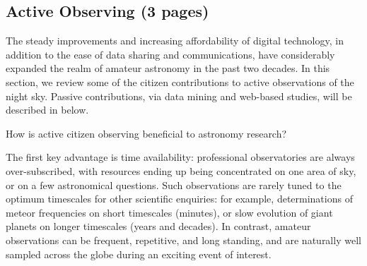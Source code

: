 \documentclass{ar2e}
\begin{document}

\subsection{Active Observing (3 pages)}
\label{sec:obs:active}



The steady improvements and increasing affordability of digital technology, in
addition to the ease of data sharing and communications, have considerably
expanded the realm of amateur astronomy in the past two decades.  
In this section, we review some of the citizen contributions to active
observations of the night sky.  Passive contributions, via data mining and
web-based studies, will be described in  below.

How is active citizen observing beneficial to astronomy research? 

The first key advantage is time availability: professional observatories are
always over-subscribed, with resources ending up being concentrated on one area
of sky, or on a few astronomical questions.  Such observations are rarely tuned
to the optimum timescales for other scientific enquiries: for example,
determinations of meteor frequencies on short timescales (minutes), or slow
evolution of giant planets on longer timescales (years and decades).  In
contrast, amateur observations can be frequent, repetitive, and long standing,
and are naturally well sampled across the globe during an exciting event of
interest. 
\end{document}
